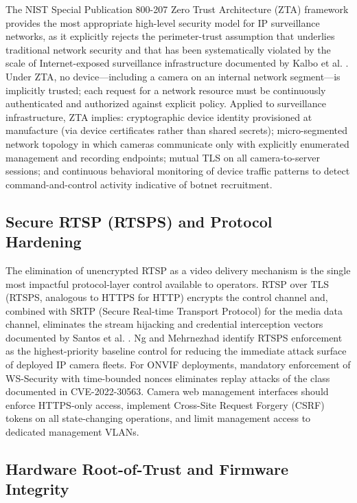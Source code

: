 \documentclass[letterpaper, 10pt, conference]{ieeeconf}
\begin{document}
The NIST Special Publication 800-207 Zero Trust Architecture (ZTA)
framework \cite{nist800207} provides the most appropriate high-level
security model for IP surveillance networks, as it explicitly rejects
the perimeter-trust assumption that underlies traditional network
security and that has been systematically violated by the scale of
Internet-exposed surveillance infrastructure documented by Kalbo
et al. \cite{kalbo2020}. Under ZTA, no device---including a camera on
an internal network segment---is implicitly trusted; each request for
a network resource must be continuously authenticated and authorized
against explicit policy. Applied to surveillance infrastructure, ZTA
implies: cryptographic device identity provisioned at manufacture
(via device certificates rather than shared secrets); micro-segmented
network topology in which cameras communicate only with explicitly
enumerated management and recording endpoints; mutual TLS on all
camera-to-server sessions; and continuous behavioral monitoring of
device traffic patterns to detect command-and-control activity
indicative of botnet recruitment.

\subsection{Secure RTSP (RTSPS) and Protocol Hardening}

The elimination of unencrypted RTSP as a video delivery mechanism
is the single most impactful protocol-layer control available to
operators. RTSP over TLS (RTSPS, analogous to HTTPS for HTTP) encrypts
the control channel and, combined with SRTP (Secure Real-time Transport
Protocol) for the media data channel, eliminates the stream hijacking
and credential interception vectors documented by Santos et al.
\cite{santos2023}. Ng and Mehrnezhad \cite{ng2024shodan} identify
RTSPS enforcement as the highest-priority baseline control for reducing
the immediate attack surface of deployed IP camera fleets. For ONVIF
deployments, mandatory enforcement of WS-Security with time-bounded
nonces eliminates replay attacks of the class documented in
CVE-2022-30563. Camera web management interfaces should enforce
HTTPS-only access, implement Cross-Site Request Forgery (CSRF) tokens
on all state-changing operations, and limit management access to
dedicated management VLANs.

\subsection{Hardware Root-of-Trust and Firmware Integrity}
\end{document}

